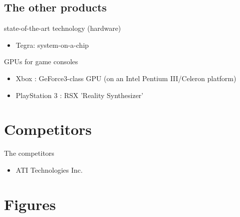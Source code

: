 \documentclass{beamer}
\begin{document}
\subsection{The other products}
\begin{frame}{}
	\transdissolve[duration=0.1]
	\begin{block}{state-of-the-art technology (hardware)}
		\begin{itemize}
			\item<+->{Tegra: system-on-a-chip}
		\end{itemize}
	\end{block}
	\begin{block}{GPUs for game consoles}
		\begin{itemize}
			\item<+->{Xbox : GeForce3-class GPU (on an Intel Pentium III/Celeron platform)}
			\item<+->{PlayStation 3 : RSX 'Reality Synthesizer'}
		\end{itemize}
	\end{block}
\end{frame}

\section{Competitors}
\begin{frame}{The competitors}
	\transdissolve[duration=0.1]
	\begin{block}{}
		\begin{itemize}
			\item<+->{ATI Technologies Inc.}
		\end{itemize}
	\end{block}
\end{frame}

\section{Figures}
\end{document}
